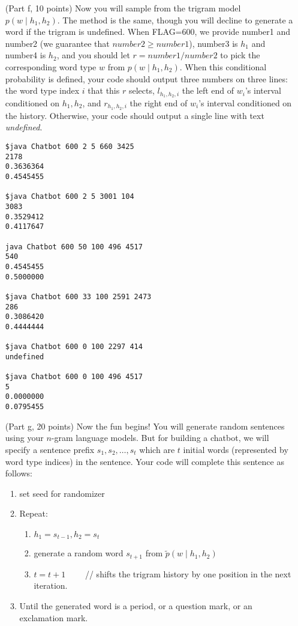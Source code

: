 \documentclass{article}
\begin{document}
\begin{itemize}
\item[(Part f, 10 points)]
Now you will sample from the trigram  model $p(w \mid h_1, h_2)$.
The method is the same, though you will decline to generate a word if the trigram is undefined.
When FLAG=600, we provide number1 and number2 (we guarantee that $number2 \ge number1$), number3 is $h_1$ and number4 is $h_2$, and you should let $r=number1/number2$ to pick the corresponding word type $w$ from $p(w\mid h_1, h_2)$.
When this conditional probability is defined, your code should output three numbers on three lines: the word type index $i$ that this $r$ selects, $l_{h_1,h_2,i}$ the left end of $w_i$'s interval conditioned on $h_1,h_2$, and $r_{h_1,h_2,i}$ the right end of $w_i$'s interval conditioned on the history.
Otherwise, your code should output a single line with text \emph{undefined}.
\begin{verbatim}
$java Chatbot 600 2 5 660 3425
2178
0.3636364
0.4545455

$java Chatbot 600 2 5 3001 104
3083
0.3529412
0.4117647

java Chatbot 600 50 100 496 4517
540
0.4545455
0.5000000

$java Chatbot 600 33 100 2591 2473
286
0.3086420
0.4444444

$java Chatbot 600 0 100 2297 414
undefined

$java Chatbot 600 0 100 496 4517
5
0.0000000
0.0795455

\end{verbatim}

\item[(Part g, 20 points)]
Now the fun begins!
You will generate random sentences using your $n$-gram language models.
But for building a chatbot, we will specify a sentence prefix $s_1, s_2, \ldots, s_t$ which are $t$ initial words (represented by word type indices) in the sentence.
Your code will complete this sentence as follows:
\begin{enumerate}
\item set seed for randomizer
\item Repeat:
   \begin{enumerate}
   \item $h_1 = s_{t-1}, h_2 =s_t$
   \item generate a random word $s_{t+1}$ from $\tilde p(w \mid h_1, h_2)$
   \item $t=t+1$  ~~~~// shifts the trigram history by one position in the next iteration.
   \end{enumerate}
\item Until the generated word is a period, or a question mark, or an exclamation mark.
\end{enumerate}



\end{itemize}
\end{document}
